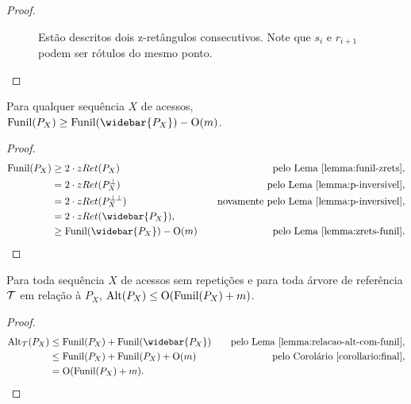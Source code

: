 \begin{proof}
\begin{figure}
    \caption{Estão descritos dois z-retângulos consecutivos. Note que $s_i$ e $r_{i+1}$ podem ser rótulos do mesmo ponto.}
    \label{fig:funil-2-z-rets}
    \end{figure}
\end{proof}

\begin{corollary} \label{corollario:final} %
    Para qualquer sequência $X$ de acessos, $\text{Funil}(P_X) \geq \text{Funil}(\widebar{P_X}) - \Oh(m)$.
\end{corollary}

\begin{proof}
    \begin{align*}
        \text{Funil}(P_X) &\geq 2 \cdot zRet(P_X) \quad & \text{pelo Lema~\ref{lemma:funil-zrets}}, \\
        &= 2 \cdot zRet(P_X^{\perp}) \quad & \text{pelo Lema~\ref{lemma:p-inversivel}}, \\
        &= 2 \cdot zRet(P_X^{\perp\perp}) \quad & \text{novamente pelo Lema~\ref{lemma:p-inversivel}}, \\
        &= 2 \cdot zRet(\widebar{P_X}), \\
        &\geq \text{Funil}(\widebar{P_X}) - \Oh(m) \quad & \text{pelo Lema~\ref{lemma:zrets-funil}}. \\
    \end{align*}
\end{proof}

\begin{theorem}
    Para toda sequência $X$ de acessos sem repetições e para toda árvore de referência $\mathcal{T}$ em relação à $P_X$, $\text{Alt}(P_X) \leq \mathrm{O}(\text{Funil}(P_X) + m)$.
\end{theorem}

\begin{proof}
    \begin{align*}
        \text{Alt}_{\cT}(P_X) &\leq \text{Funil}(P_X) +  \text{Funil}(\widebar{P_X}) \quad & \text{pelo Lema~\ref{lemma:relacao-alt-com-funil}}, \\
        &\leq \text{Funil}(P_X) +  \text{Funil}(P_X) + \Oh(m) \quad & \text{pelo Corolário~\ref{corollario:final}}, \\
        &= \Oh(\text{Funil}(P_X) + m).
    \end{align*}
\end{proof}

